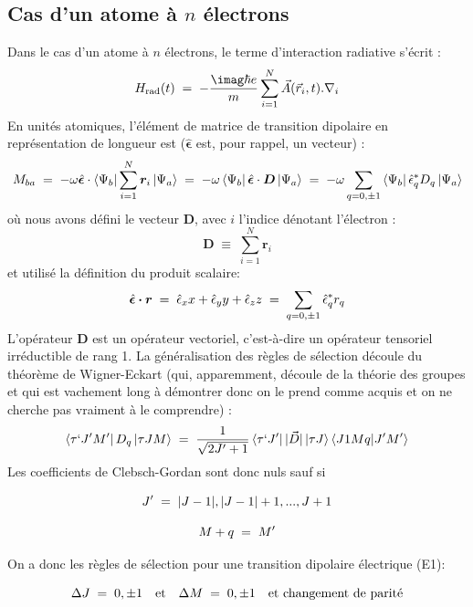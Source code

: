 \subsection{Cas d'un atome à $n$ électrons}
Dans le cas d'un atome à $n$ électrons, le terme d'interaction radiative s'écrit :
\begin{equation}
    H_\text{rad}(t)\eq -\dfrac{\imag\hbar e}{m}\sum_{i=1}^{N} \vec{A}(\vec{r}_i,t).\nabla_i
\end{equation}
En unités atomiques, l'élément de matrice de transition dipolaire en représentation de longueur est ($\hat{\bm{\epsilon}}$ est, pour rappel, un vecteur) :
\begin{equation}
    M_{ba} \; = \;
    -\omega \hat{\bm{\epsilon}}\cdot\bra{\Psi_b}\sum_{i=1}^{N} \bm{r}_i\ket{\Psi_a}
    \; = \;
    -\omega \bra{\Psi_b}\hat{\bm{\epsilon}} \cdot \bm{D}\ket{\Psi_a}
    \; = \;
    -\omega \sum_{q=0,\pm 1}\bra{\Psi_b}\hat{\epsilon}_q^* D_q\ket{\Psi_a}
\end{equation}
où nous avons défini le vecteur $\bm{D}$, avec $i$ l'indice dénotant l'électron :
\[
    \bm{D} \;\equiv\; \sum_{i=1}^N \bm{r}_i
\]
et utilisé la définition du produit scalaire:
\begin{equation}
    \hat{\bm{\epsilon}}\boldsymbol{\cdot} \bm{r} \; = \; \hat{\epsilon}_xx + \hat{\epsilon}_yy + \hat{\epsilon}_zz \; = \; \sum_{q=0,\pm 1}  \hat{\epsilon}_q^* r_q
\end{equation}
L'opérateur $\bm{D}$ est un opérateur vectoriel, c'est-à-dire un opérateur tensoriel irréductible de rang 1. La généralisation des règles de sélection découle du théorème de Wigner-Eckart (qui, apparemment, découle de la théorie des groupes et qui est vachement long à démontrer donc on le prend comme acquis et on ne cherche pas vraiment à le comprendre) :
\begin{equation}
    \bra{\tau ` J'M'}D_q\ket{\tau JM}\; = \; \dfrac{1}{\sqrt{2J'+1}}\bra{\tau `J'}|\vec{D}|\ket{\tau J}\bra{J1Mq}\ket{J'M'}
\end{equation}
Les coefficients de Clebsch-Gordan sont donc nuls sauf si

\[
    J'\; = \; |J-1|, |J-1|+1, ..., J+1
\]

\[
    M+q\; = \; M'
\]

On a donc les règles de sélection pour une transition dipolaire électrique (E1):

\begin{equation}
    \Delta J\; = \; 0, \pm1 \quad \text{et} \quad \Delta M\; = \; 0, \pm 1 \quad \text{et        changement de parité}
\end{equation}



